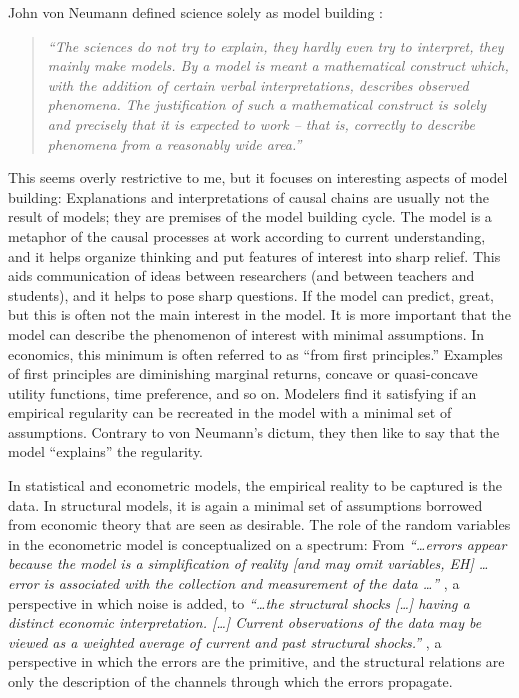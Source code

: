 \documentclass[10pt]{article}
\begin{document}
John von Neumann defined science solely as model building \citep{Neumann1995}:
\begin{quote}\it
``The sciences do not try to explain, they hardly even try to interpret, they mainly make models. By a model is meant a mathematical construct which, with the addition of certain verbal interpretations, describes observed phenomena. The justification of such a mathematical construct is solely and precisely that it is expected to work -- that is, correctly to describe phenomena from a reasonably wide area.''
\end{quote}
This seems overly restrictive to me, but it focuses on interesting aspects of model building: Explanations and interpretations of causal chains are usually not the result of models; they are premises of the model building cycle. The model is a metaphor of the causal processes at work according to current understanding, and it helps organize thinking and put features of interest into sharp relief. This aids communication of ideas between researchers (and between teachers and students), and it helps to pose sharp questions. If the model can predict, great, but this is often not the main interest in the model. It is more important that the model can describe the phenomenon of interest with minimal assumptions. In economics, this minimum is often referred to as ``from first principles.'' Examples of first principles are diminishing marginal returns, concave or quasi-concave utility functions, time preference, and so on. Modelers find it satisfying if an empirical regularity can be recreated in the model with a minimal set of assumptions. Contrary to von Neumann's dictum, they then like to say that the model ``explains'' the regularity. 

In statistical and econometric models, the empirical reality to be captured is the data. In structural models, it is again a minimal set of assumptions borrowed from economic theory that are seen as desirable. The role of the random variables in the econometric model is conceptualized on a spectrum: From \textit{``\ldots errors appear because the model is a simplification of reality [and may omit variables, EH] \ldots error is associated with the collection and measurement of the data \ldots''} \citep[p. 58]{Pindyck1998}, a perspective in which noise is added, to \textit{``\ldots the structural shocks [\ldots] having a distinct economic interpretation. [\ldots] Current observations of the data may be viewed as a weighted average of current and past structural shocks.''} \citep[p. 2,3]{Kilian2017}, a perspective in which the errors are the primitive, and the structural relations are only the description of the channels through which the errors propagate. 
\end{document}
